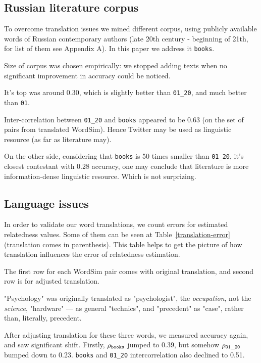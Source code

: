 \documentclass[11pt,letterpaper]{article}
\begin{document}
\subsection{Russian literature corpus}

To overcome translation issues we mined different corpus, using publicly 
available words of Russian contemporary authors (late 20th century - beginning
of 21th, for list of them see Appendix A). In this paper we address it 
{\tt books}.

Size of corpus was chosen empirically: we stopped adding texts when 
no significant improvement in accuracy could be noticed.

It's top was around 0.30, which is slightly better than {\tt 01\_20}, 
and much better than {\tt 01}. 

Inter-correlation between {\tt 01\_20} 
and {\tt books} appeared to be 0.63 (on the set of pairs
from translated WordSim).
Hence Twitter may be used as linguistic resource (as far as literature may). 

On the other side, considering that {\tt books} is 50
times smaller than {\tt 01\_20}, it's closest contestant with 0.28 accuracy, 
one may conclude that literature is more information-dense linguistic resource.
Which is not surprizing.


\subsection{Language issues}

In order to validate our word translations, we count errors for estimated
relatedness values. Some of them can be seen at Table~\ref{translation-error} 
(translation comes in parenthesis). 
This table helps to get the picture of how translation influences the error
of relatedness estimation.

The first row for each WordSim pair
comes with original translation, and second row is for adjusted translation.

"Psychology" was originally translated as "psychologist", the {\em occupation}, 
not the {\em science},
"hardware" --- as general "technics", and "precedent" as "case", rather than, 
literally, precedent. 

After adjusting translation for these three words, we measured accuracy again, 
and saw significant shift. Firstly, $ \rho_{\tt books}$ jumped to 0.39, 
but somehow $ \rho_{\tt 01\_20} $ bumped down to 0.23. {\tt books} and {\tt 01\_20}
intercorrelation also declined to 0.51.
\end{document}
